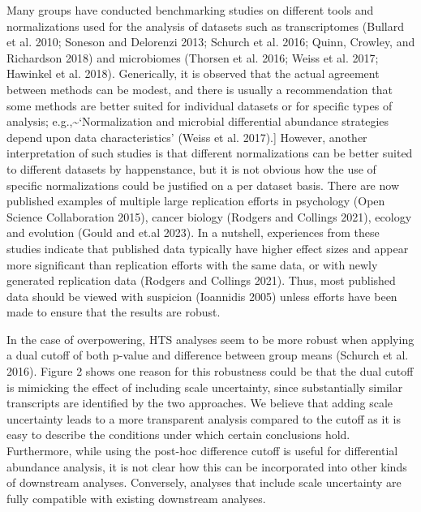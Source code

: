 \documentclass[
]{article}
\begin{document}
Many groups have conducted benchmarking studies on different tools and
normalizations used for the analysis of datasets such as transcriptomes
(Bullard et al. 2010; Soneson and Delorenzi 2013; Schurch et al. 2016;
Quinn, Crowley, and Richardson 2018) and microbiomes (Thorsen et al.
2016; Weiss et al. 2017; Hawinkel et al. 2018). Generically, it is
observed that the actual agreement between methods can be modest, and
there is usually a recommendation that some methods are better suited
for individual datasets or for specific types of analysis;
e.g.,\textasciitilde`Normalization and microbial differential abundance
strategies depend upon data characteristics' (Weiss et al. 2017).{]}
However, another interpretation of such studies is that different
normalizations can be better suited to different datasets by
happenstance, but it is not obvious how the use of specific
normalizations could be justified on a per dataset basis. There are now
published examples of multiple large replication efforts in psychology
(Open Science Collaboration 2015), cancer biology (Rodgers and Collings
2021), ecology and evolution (Gould and et.al 2023). In a nutshell,
experiences from these studies indicate that published data typically
have higher effect sizes and appear more significant than replication
efforts with the same data, or with newly generated replication data
(Rodgers and Collings 2021). Thus, most published data should be viewed
with suspicion (Ioannidis 2005) unless efforts have been made to ensure
that the results are robust.

In the case of overpowering, HTS analyses seem to be more robust when
applying a dual cutoff of both p-value and difference between group
means (Schurch et al. 2016). Figure 2 shows one reason for this
robustness could be that the dual cutoff is mimicking the effect of
including scale uncertainty, since substantially similar transcripts are
identified by the two approaches. We believe that adding scale
uncertainty leads to a more transparent analysis compared to the cutoff
as it is easy to describe the conditions under which certain conclusions
hold. Furthermore, while using the post-hoc difference cutoff is useful
for differential abundance analysis, it is not clear how this can be
incorporated into other kinds of downstream analyses. Conversely,
analyses that include scale uncertainty are fully compatible with
existing downstream analyses.
\end{document}
